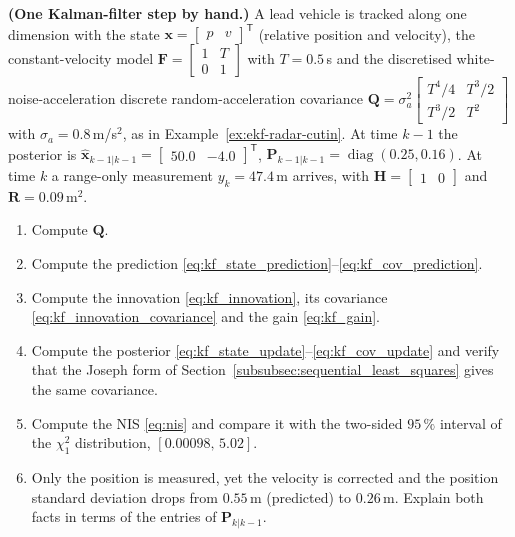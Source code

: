 \documentclass[graybox,envcountchap]{style/SNmono}
\DeclareMathOperator{\diag}{diag}
\providecommand{\DIFadd}[1]{{\protect\color{blue} #1}} %
\providecommand{\DIFdel}[1]{{\protect\color{red} #1}} %
\providecommand{\DIFaddbegin}{} %
\providecommand{\DIFaddend}{} %
\providecommand{\DIFdelbegin}{} %
\providecommand{\DIFdelend}{} %
\begin{document}
\begin{prob}\label{prob:ch03:4}
\textbf{(One Kalman-filter step by hand.)} A lead vehicle is tracked along one dimension with the state $\mathbf{x}=\begin{bmatrix}p&v\end{bmatrix}^{\mathsf T}$ (relative position and velocity), the constant-velocity model $\mathbf{F}=\begin{bmatrix}1&T\\0&1\end{bmatrix}$ with $T=0.5$\,s and the \DIFdelbegin \DIFdel{discretised white-noise-acceleration }\DIFdelend \DIFaddbegin \DIFadd{discrete random-acceleration }\DIFaddend covariance $\mathbf{Q}=\sigma_a^{2}\begin{bmatrix}T^{4}/4&T^{3}/2\\T^{3}/2&T^{2}\end{bmatrix}$ with $\sigma_a=0.8$\,m/s$^{2}$, as in Example~\ref{ex:ekf-radar-cutin}. At time $k-1$ the posterior is $\widehat{\mathbf{x}}_{k-1|k-1}=\begin{bmatrix}50.0&-4.0\end{bmatrix}^{\mathsf T}$, $\mathbf{P}_{k-1|k-1}=\diag(0.25,0.16)$. At time $k$ a range-only measurement $y_k=47.4$\,m arrives, with $\mathbf{H}=\begin{bmatrix}1&0\end{bmatrix}$ and $\mathbf{R}=0.09$\,m$^{2}$.
\begin{enumerate}
\item[(a)] Compute $\mathbf{Q}$.
\item[(b)] Compute the prediction \eqref{eq:kf_state_prediction}--\eqref{eq:kf_cov_prediction}.
\item[(c)] Compute the innovation \eqref{eq:kf_innovation}, its covariance \eqref{eq:kf_innovation_covariance} and the gain \eqref{eq:kf_gain}.
\item[(d)] Compute the posterior \eqref{eq:kf_state_update}--\eqref{eq:kf_cov_update} and verify that the Joseph form of Section~\ref{subsubsec:sequential_least_squares} gives the same covariance.
\item[(e)] Compute the NIS \eqref{eq:nis} and compare it with the two-sided $95\,\%$ interval of the $\chi^{2}_{1}$ distribution, $[0.00098,\,5.02]$.
\item[(f)] Only the position is measured, yet the velocity is corrected and the position standard deviation drops from $0.55$\,m (predicted) to $0.26$\,m. Explain both facts in terms of the entries of $\mathbf{P}_{k|k-1}$.
\end{enumerate}
\end{prob}
\end{document}
